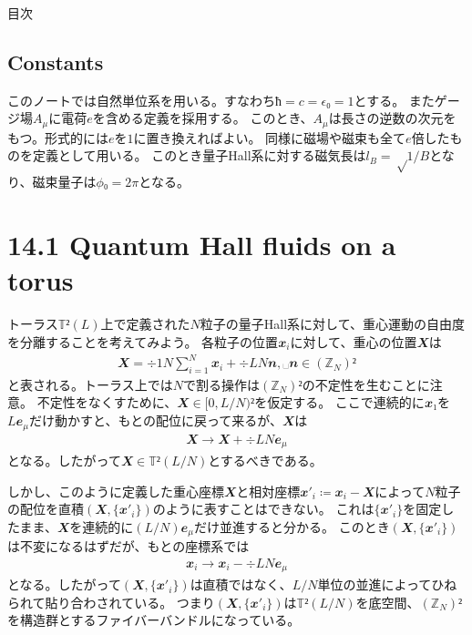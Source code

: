 \documentclass[\main/main.tex]{subfiles}
\begin{document}
\title{}
\subtitle{Fradkin 14章}
\author{政岡凜太郎}
\frame{\titlepage}
\begin{frame}{目次}\tableofcontents\end{frame}
\subsection*{Constants}
\begin{frame}{\currentname}
    このノートでは自然単位系を用いる。すなわち$ħ = c = ϵ₀ = 1$とする。
    またゲージ場$A_μ$に電荷$e$を含める定義を採用する。
    このとき、$A_μ$は長さの逆数の次元をもつ。形式的には$e$を$1$に置き換えればよい。
    同様に磁場や磁束も全て$e$倍したものを定義として用いる。
    このとき量子Hall系に対する磁気長は$l_B = √{1/B}$となり、磁束量子は$ϕ₀ = 2π$となる。
\end{frame}
\section{14.1 Quantum Hall fluids on a torus}
\begin{frame}{\currentname}
    トーラス$𝕋²(L)$上で定義された$N$粒子の量子Hall系に対して、重心運動の自由度を分離することを考えてみよう。
    各粒子の位置$𝒙_i$に対して、重心の位置$𝑿$は
    \begin{align}
        𝑿 = ÷1{N}∑_{i=1}^N 𝒙_i + ÷{L}{N}𝒏,␣ 𝒏 ∈ (ℤ_N)²
    \end{align}
    と表される。トーラス上では$N$で割る操作は$(ℤ_N)²$の不定性を生むことに注意。
    不定性をなくすために、$𝑿 ∈ [0,L/N)²$を仮定する。
    ここで連続的に$𝒙₁$を$L𝒆_μ$だけ動かすと、もとの配位に戻って来るが、$𝑿$は
    \begin{align}
        𝑿 → 𝑿 + ÷{L}{N}𝒆_μ
    \end{align}
    となる。したがって$𝑿 ∈ 𝕋²(L/N)$とするべきである。

    しかし、このように定義した重心座標$𝑿$と相対座標$𝒙'_i ≔ 𝒙_i - 𝑿$によって$N$粒子の配位を直積$(𝑿,\{𝒙'_i\})$のように表すことはできない。
    これは$\{𝒙'_i\}$を固定したまま、$𝑿$を連続的に$(L/N)𝒆_μ$だけ並進すると分かる。
    このとき$(𝑿,\{𝒙'_i\})$は不変になるはずだが、もとの座標系では
    \begin{align}
        𝒙_i → 𝒙_i - ÷{L}{N}𝒆_μ
    \end{align}
    となる。したがって$(𝑿,\{𝒙'_i\})$は直積ではなく、$L/N$単位の並進によってひねられて貼り合わされている。
    つまり$(𝑿,\{𝒙'_i\})$は$𝕋²(L/N)$を底空間、$(ℤ_N)²$を構造群とするファイバーバンドルになっている。
\end{frame}
\end{document}
